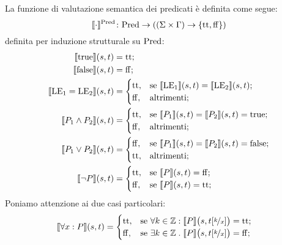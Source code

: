 \begin{definizione} 
La funzione di valutazione semantica dei predicati è definita come segue:
\[
   \mathord{\llbracket \cdot \rrbracket ^{\mathrm{Pred}}}\colon\mathrm{Pred}\to((\Sigma \times \Gamma) \rightarrow \{\mathrm{tt},\mathrm{ff}\})
\]
definita per induzione strutturale su $\mathrm{Pred}$:
\begin{align*}
   \llbracket \mathrm{true} \rrbracket(s,t)
      &= \mathrm{tt};\\
   \llbracket \mathrm{false} \rrbracket(s,t)
      &= \mathrm{ff};\\
   \llbracket \mathrm{LE}_1 = \mathrm{LE}_2\rrbracket(s,t)
      &=
        \begin{cases}
                \mathrm{tt}, &\text{se $\llbracket\mathrm{LE}_1\rrbracket(s,t) = \llbracket \mathrm{LE}_2 \rrbracket(s,t)$};\\
                \mathrm{ff}, &\text{altrimenti};
        \end{cases}\\
    \llbracket P_1 \land P_2\rrbracket(s,t)
      &=
        \begin{cases}
                \mathrm{tt}, &\text{se $\llbracket P_1\rrbracket(s,t) = \llbracket P_2\rrbracket(s,t) = \mathrm{true}$};\\
                \mathrm{ff}, &\text{altrimenti};
        \end{cases}\\
    \llbracket P_1 \lor P_2\rrbracket(s,t)
      &=
        \begin{cases}
                \mathrm{ff}, &\text{se $\llbracket P_1\rrbracket(s,t) = \llbracket P_2\rrbracket(s,t) = \mathrm{false}$};\\
                \mathrm{tt}, &\text{altrimenti};
        \end{cases} \\
    \llbracket \neg P\rrbracket(s,t)
       &=
        \begin{cases}
                \mathrm{tt},&\text{se $\llbracket P\rrbracket(s,t) = \mathrm{ff}$};\\
                \mathrm{ff},&\text{se $\llbracket P\rrbracket(s,t) = \mathrm{tt}$};
        \end{cases}
\end{align*}
Poniamo attenzione ai due casi particolari:
\begin{align*}
   \llbracket\forall x \mathrel{:} P\rrbracket(s,t)
      &=
        \begin{cases}
                \mathrm{tt}, &\text{se $\forall k \in \mathbb{Z} \mathrel{:} \llbracket P \rrbracket \bigl(s,t[\nicefrac{k}{x}]\bigr) = \mathrm{tt}$};\\
                \mathrm{ff}, &\text{se $\exists k \in \mathbb{Z} \mathrel{.} \llbracket P \rrbracket \bigl(s,t[\nicefrac{k}{x}]\bigr) = \mathrm{ff}$};

\end{cases}
\end{align*}
\end{definizione}
